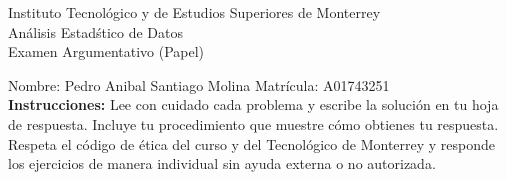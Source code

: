 \documentclass[10pt]{report}
\begin{document}
\newpage



\begin{center}
{\large Instituto Tecnol\'{o}gico y de Estudios Superiores de Monterrey \\
An\'alisis Estad\'stico de Datos } \\
Examen Argumentativo (Papel)
\end{center}

Nombre: \underline{\hspace*{.2in}}
Pedro Anibal Santiago Molina
\underline{\hspace*{.2in}} \quad Matr\'icula:\underline{\hspace*{.2in}}
A01743251
\underline{\hspace*{.2in}} \\

{\bf Instrucciones:} Lee con cuidado cada problema y escribe la soluci\'on
en tu hoja de respuesta. Incluye tu procedimiento que muestre c\'omo obtienes tu respuesta.  Respeta el c\'odigo de \'etica del curso y del Tecnol\'ogico de Monterrey y responde los ejercicios de manera individual sin ayuda externa o no autorizada.
\end{document}
